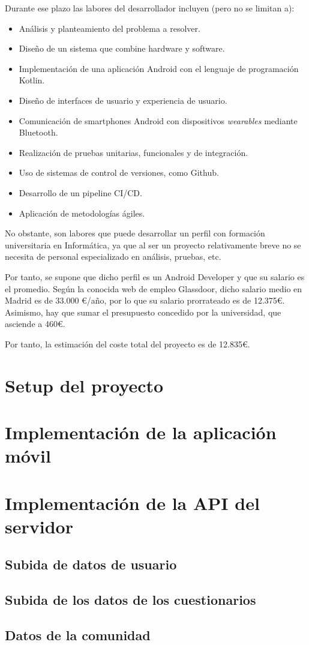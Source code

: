                 Durante ese plazo las labores del desarrollador incluyen (pero no se limitan a):
                \begin{itemize}
                    \item Análisis y planteamiento del problema a resolver.
                    \item Diseño de un sistema que combine hardware y software.
                    \item Implementación de una aplicación Android con el lenguaje de programación Kotlin.
                    \item Diseño de interfaces de usuario y experiencia de usuario. 
                    \item Comunicación de smartphones Android con dispositivos \textit{wearables} mediante Bluetooth.
                    \item Realización de pruebas unitarias, funcionales y de integración.
                    \item Uso de sistemas de control de versiones, como Github.
                    \item Desarrollo de un pipeline CI/CD.
                    \item Aplicación de metodologías ágiles.
                \end{itemize}
                
                No obstante, son labores que puede desarrollar un perfil con formación universitaria en Informática, ya que al ser un proyecto relativamente breve no se necesita de personal especializado en análisis, pruebas, etc. 
                
                Por tanto, se supone que dicho perfil es un Android Developer y que su salario es el promedio. Según la conocida web de empleo Glassdoor, dicho salario medio en Madrid es de 33.000 €/año, por lo que su salario prorrateado es de 12.375€. Asimismo, hay que sumar el presupuesto concedido por la universidad, que asciende a 460€.
                
                Por tanto, la estimación del coste total del proyecto es de 12.835€.

     
    \section{Setup del proyecto}

    \section{Implementación de la aplicación móvil}

    \section{Implementación de la API del servidor}

        \subsection{Subida de datos de usuario}

        \subsection{Subida de los datos de los cuestionarios}

        \subsection{Datos de la comunidad}